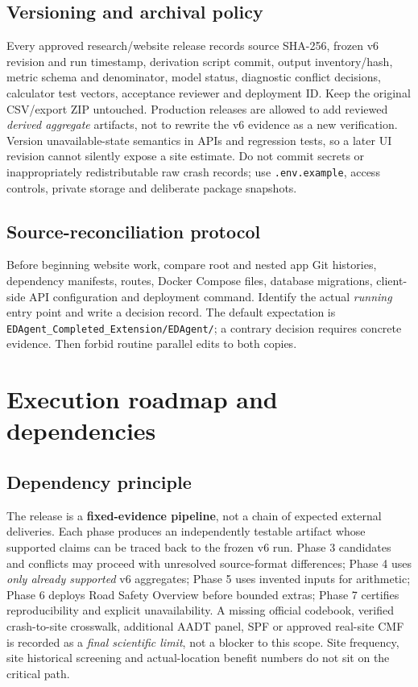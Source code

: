 \documentclass[11pt,a4paper,openany]{report}
\newcommand{\pathcode}[1]{\nolinkurl{#1}}
\begin{document}
\section{Versioning and archival policy}
Every approved research/website release records source SHA-256, frozen v6 revision and run timestamp, derivation script commit, output inventory/hash, metric schema and denominator, model status, diagnostic conflict decisions, calculator test vectors, acceptance reviewer and deployment ID. Keep the original CSV/export ZIP untouched. Production releases are allowed to add reviewed \emph{derived aggregate} artifacts, not to rewrite the v6 evidence as a new verification. Version unavailable-state semantics in APIs and regression tests, so a later UI revision cannot silently expose a site estimate. Do not commit secrets or inappropriately redistributable raw crash records; use \pathcode{.env.example}, access controls, private storage and deliberate package snapshots.

\section{Source-reconciliation protocol}
Before beginning website work, compare root and nested app Git histories, dependency manifests, routes, Docker Compose files, database migrations, client-side API configuration and deployment command. Identify the actual \emph{running} entry point and write a decision record. The default expectation is \pathcode{EDAgent_Completed_Extension/EDAgent/}; a contrary decision requires concrete evidence. Then forbid routine parallel edits to both copies.

\chapter{Execution roadmap and dependencies}
\section{Dependency principle}
The release is a \textbf{fixed-evidence pipeline}, not a chain of expected external deliveries. Each phase produces an independently testable artifact whose supported claims can be traced back to the frozen v6 run. Phase 3 candidates and conflicts may proceed with unresolved source-format differences; Phase 4 uses \emph{only already supported} v6 aggregates; Phase 5 uses invented inputs for arithmetic; Phase 6 deploys Road Safety Overview before bounded extras; Phase 7 certifies reproducibility and explicit unavailability. A missing official codebook, verified crash-to-site crosswalk, additional AADT panel, SPF or approved real-site CMF is recorded as a \emph{final scientific limit}, not a blocker to this scope. Site frequency, site historical screening and actual-location benefit numbers do not sit on the critical path.
\end{document}
